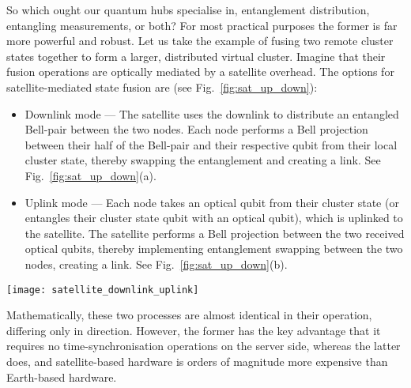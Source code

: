 So which ought our quantum hubs specialise in, entanglement distribution, entangling measurements, or both? For most practical purposes the former is far more powerful and robust. Let us take the example of fusing two remote cluster states together to form a larger, distributed virtual cluster. Imagine that their fusion operations are optically mediated by a satellite overhead. The options for satellite-mediated state fusion are (see Fig.~\ref{fig:sat_up_down}):
\begin{itemize}
	\item Downlink mode --- The satellite uses the downlink to distribute an entangled Bell-pair between the two nodes. Each node performs a Bell projection between their half of the Bell-pair and their respective qubit from their local cluster state, thereby swapping the entanglement and creating a link. See Fig.~\ref{fig:sat_up_down}(a).
	\item Uplink mode --- Each node takes an optical qubit from their cluster state (or entangles their cluster state qubit with an optical qubit), which is uplinked to the satellite. The satellite performs a Bell projection between the two received optical qubits, thereby implementing entanglement swapping between the two nodes, creating a link. See Fig.~\ref{fig:sat_up_down}(b).
\end{itemize}

\begin{figure*}[!htb]
	\texttt{[image: satellite\_downlink\_uplink]}
	\caption{Satellite-mediated cluster state fusion operations for creating a link between two cluster states held by distant ground nodes. (a) Via entanglement distribution over a downlink channel. (b) Via distributed Bell projection over an uplink channel. When performing a distributed Bell measurement it is essential that the optical qubits arrive synchronously at the entangling measurement device, denoted \mbox{$\ket{\Psi^+}\bra{\Psi^+}$} (e.g a PBS), which is technologically challenging to implement on satellite given the unpredictable nature of the atmospheric quantum channel, necessitating on-board quantum memories to synchronise the qubits. This is likely to make (a) cheaper, faster and more efficient than (b).} \label{fig:sat_up_down}
\end{figure*}

Mathematically, these two processes are almost identical in their operation, differing only in direction. However, the former has the key advantage that it requires no time-synchronisation operations on the server side, whereas the latter does, and satellite-based hardware is orders of magnitude more expensive than Earth-based hardware.


